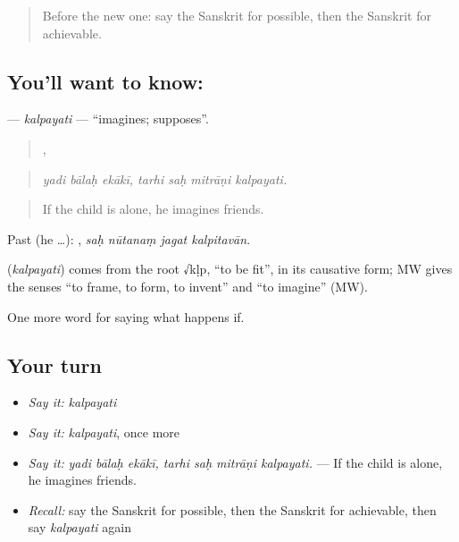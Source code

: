 \label{lesson:SA-C389-kalpayati}



\begin{quote}
Before the new one: say the Sanskrit for possible, then the Sanskrit for achievable.
\end{quote}

\subsection*{You'll want to know: }
\textbf{} — \emph{kalpayati} — \textquotedblleft{}imagines; supposes\textquotedblright{}.

\begin{quote}
  ,    
\end{quote}

\begin{quote}
\emph{yadi bālaḥ ekākī, tarhi saḥ mitrāṇi kalpayati.}
\end{quote}

\begin{quote}
If the child is alone, he imagines friends.
\end{quote}

Past (he …):    , \emph{saḥ nūtanaṃ jagat kalpitavān}.

\begin{cousinweb}
\textbf{} (\emph{kalpayati}) comes from the root √kḷp, \textquotedblleft{}to be fit\textquotedblright{}, in its causative form; MW gives the senses \textquotedblleft{}to frame, to form, to invent\textquotedblright{} and \textquotedblleft{}to imagine\textquotedblright{} (MW).
\end{cousinweb}

\begin{grammarlens}[title={What you've built}]
One more word for saying what happens if.
\end{grammarlens}

\subsection*{Your turn}
\begin{itemize}
\raggedright
  \item \emph{Say it:} \emph{kalpayati}
  \item \emph{Say it:} \emph{kalpayati}, once more
  \item \emph{Say it:} \emph{yadi bālaḥ ekākī, tarhi saḥ mitrāṇi kalpayati.} — If the child is alone, he imagines friends.
  \item \emph{Recall:} say the Sanskrit for possible, then the Sanskrit for achievable, then say \emph{kalpayati} again
\end{itemize}

